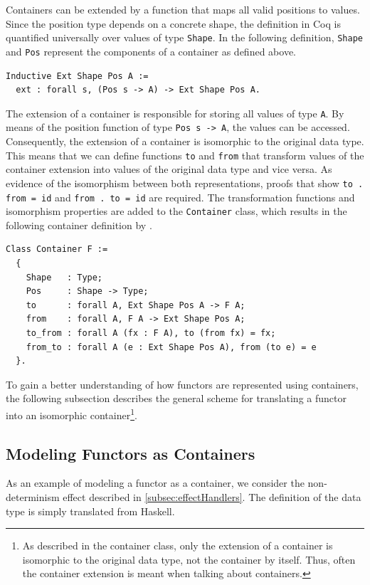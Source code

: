 \documentclass[a4paper, 11pt, fleqn, twoside]{scrreprt}
\newcommand{\hinl}[1]{\texttt{#1}}
\newcommand{\cinl}[1]{\texttt{#1}}
\begin{document}
Containers can be extended by a function that maps all valid positions to values.
Since the position type depends on a concrete shape, the definition in Coq is quantified universally over values of type \cinl{Shape}.
In the following definition, \cinl{Shape} and \cinl{Pos} represent the components of a container as defined above.

\begin{verbatim}
Inductive Ext Shape Pos A := 
  ext : forall s, (Pos s -> A) -> Ext Shape Pos A.
\end{verbatim}

The extension of a container is responsible for storing all values of type \cinl{A}.
By means of the position function of type \cinl{Pos s -> A}, the values can be accessed.
Consequently, the extension of a container is isomorphic to the original data type.
This means that we can define functions \cinl{to} and \cinl{from} that transform values of the container extension into values of the original data type and vice versa.
As evidence of the isomorphism between both representations, proofs that show \cinl{to . from = id} and \hinl{from . to = id} are required.
The transformation functions and isomorphism properties are added to the \cinl{Container} class, which results in the following container definition by \citet{dylus2019oneMonad}.

\begin{verbatim}
Class Container F :=
  {
    Shape   : Type;
    Pos     : Shape -> Type;
    to      : forall A, Ext Shape Pos A -> F A;
    from    : forall A, F A -> Ext Shape Pos A;
    to_from : forall A (fx : F A), to (from fx) = fx;
    from_to : forall A (e : Ext Shape Pos A), from (to e) = e
  }.
\end{verbatim}

To gain a better understanding of how functors are represented using containers, the following subsection describes the general scheme for translating a functor into an isomorphic container\footnote{As described in the container class, only the extension of a container is isomorphic to the original data type, not the container by itself. Thus, often the container extension is meant when talking about containers.}.

\subsection{Modeling Functors as Containers}
As an example of modeling a functor as a container, we consider the non-determinism effect described in \autoref{subsec:effectHandlers}.
The definition of the data type is simply translated from Haskell.
\end{document}
